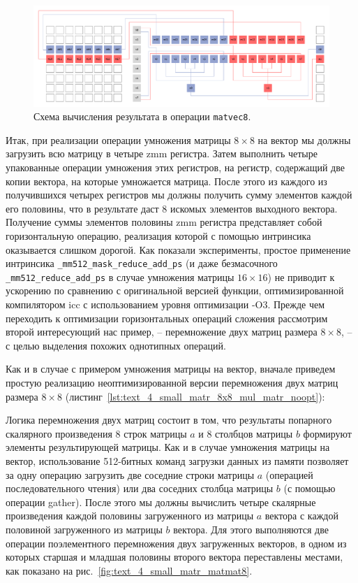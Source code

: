 \begin{figure}[ht]
\centering
\includegraphics[width=1.0\textwidth]{./fig/vec_matvec8.pdf}
\singlespacing
{}\caption{Схема вычисления результата в операции \texttt{matvec8}.}
\label{fig:text_4_small_matr_matvec8}
\end{figure}

Итак, при реализации операции умножения матрицы $8 \times 8$ на вектор мы должны загрузить всю матрицу в четыре zmm регистра.
Затем выполнить четыре упакованные операции умножения этих регистров, на регистр, содержащий две копии вектора, на которые умножается матрица.
После этого из каждого из получившихся четырех регистров мы должны получить сумму элементов каждой его половины, что в результате даст 8 искомых элементов выходного вектора.
Получение суммы элементов половины zmm регистра представляет собой горизонтальную операцию, реализация которой с помощью интринсика оказывается слишком дорогой.
Как показали эксперименты, простое применение интринсика \texttt{\_mm512\_mask\_reduce\_add\_ps} (и даже безмасочного \texttt{\_mm512\_reduce\_add\_ps} в случае умножения матрицы $16 \times 16$) не приводит к ускорению по сравнению с оригинальной версией функции, оптимизированной компилятором icc с использованием уровня оптимизации -O3.
Прежде чем переходить к оптимизации горизонтальных операций сложения рассмотрим второй интересующий нас пример, -- перемножение двух матриц размера $8 \times 8$, -- с целью выделения похожих однотипных операций.

Как и в случае с примером умножения матрицы на вектор, вначале приведем простую реализацию неоптимизированной версии перемножения двух матриц размера $8 \times 8$ (листинг~\ref{lst:text_4_small_matr_8x8_mul_matr_noopt}):

Логика перемножения двух матриц состоит в том, что результаты попарного скалярного произведения 8 строк матрицы $a$ и 8 столбцов матрицы $b$ формируют элементы результирующей матрицы.
Как и в случае умножения матрицы на вектор, использование 512-битных команд загрузки данных из памяти позволяет за одну операцию загрузить две соседние строки матрицы $a$ (операцией последовательного чтения) или два соседних столбца матрицы $b$ (с помощью операции gather).
После этого мы должны вычислить четыре скалярные произведения каждой половины загруженного из матрицы $a$ вектора с каждой половиной загруженного из матрицы $b$ вектора.
Для этого выполняются две операции поэлементного перемножения двух загруженных векторов, в одном из которых старшая и младшая половины второго вектора переставлены местами, как показано на рис.~\ref{fig:text_4_small_matr_matmat8}.

